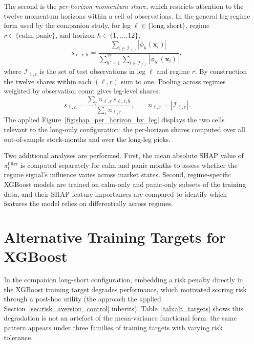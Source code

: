 The second is the \emph{per-horizon momentum share}, which restricts attention to the twelve momentum horizons within a cell of observations. In the general leg-regime form used by the companion study, for leg $\ell \in \{\text{long}, \text{short}\}$, regime $r \in \{\text{calm}, \text{panic}\}$, and horizon $h \in \{1, \ldots, 12\}$,
\begin{equation}
    s_{\ell, r, h} = \frac{\sum_{i \in \mathcal{I}_{\ell, r}} |\phi_h(\mathbf{x}_i)|}{\sum_{h' = 1}^{12} \sum_{i \in \mathcal{I}_{\ell, r}} |\phi_{h'}(\mathbf{x}_i)|},
\end{equation}
where $\mathcal{I}_{\ell, r}$ is the set of test observations in leg $\ell$ and regime $r$. By construction the twelve shares within each $(\ell, r)$ sum to one. Pooling across regimes weighted by observation count gives leg-level shares:
\begin{equation}
    s_{\ell, h} = \frac{\sum_r n_{\ell, r} \, s_{\ell, r, h}}{\sum_r n_{\ell, r}}, \qquad n_{\ell, r} = |\mathcal{I}_{\ell, r}|.
\end{equation}
The applied Figure~\ref{fig:shap_per_horizon_by_leg} displays the two cells relevant to the long-only configuration: the per-horizon shares computed over all out-of-sample stock-months and over the long-leg picks.

Two additional analyses are performed. First, the mean absolute SHAP value of $\pi_t^{\text{filter}}$ is computed separately for calm and panic months to assess whether the regime signal's influence varies across market states. Second, regime-specific XGBoost models are trained on calm-only and panic-only subsets of the training data, and their SHAP feature importances are compared to identify which features the model relies on differentially across regimes.

\section{Alternative Training Targets for XGBoost}\label{app:alt_targets}

In the companion long-short configuration, embedding a risk penalty directly in the XGBoost training target degrades performance, which motivated scoring risk through a post-hoc utility (the approach the applied Section~\ref{sec:risk_aversion_control} inherits). Table~\ref{tab:alt_targets} shows this degradation is not an artefact of the mean-variance functional form: the same pattern appears under three families of training targets with varying risk tolerance.

